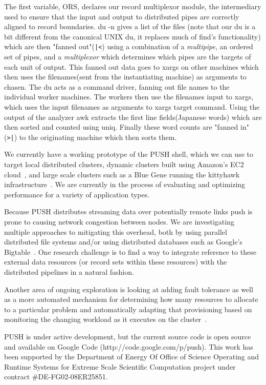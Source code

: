 \documentclass[11pt, letterpaper]{article}
\begin{document}
The first variable, ORS, declares our record multiplexor module, the intermediary 
used to ensure that the input and output to distributed pipes are correctly 
aligned to record boundaries. du -n gives a list of the files (note that our 
du is a bit different from the canonical UNIX du, it replaces much of find's 
functionality) which are then "fanned out"(\verb!|<!) using a combination 
of a \emph{multipipe}, an ordered set of pipes, and a \emph{multiplexor} 
which determines which pipes are the targets of each unit of output.  
This fanned out data goes to xargs on other machines which 
then uses the filenames(sent from the instantiating machine) as arguments to 
chasen. The du acts as a command driver, fanning out file names to the 
individual worker machines. The workers then use the filenames input to 
xargs, which uses the input filenames as arguments to xargs target command. 
Using the output of the analyzer awk extracts the first line fields(Japanese 
words) which are then sorted and counted using uniq.  Finally these word 
counts are "fanned in"(\verb!>|!) to the originating machine which then 
sorts them. 

We currently have a working prototype of the PUSH shell, which we can use
to target local distributed clusters, dynamic clusters built using Amazon's
EC2 cloud~\cite{amazon:aec}, and large scale clusters such as a Blue Gene 
running the kittyhawk infrastructure~\cite{appavoo2008pkb}.  We are currently
in the process of evaluating and optimizing performance for a variety of 
application types.

Because PUSH distributes streaming data over potentially remote links push 
is prone to causing network congestion between nodes. 
We are investigating multiple approaches to mitigating this overhead, both
by using parallel distributed file systems and/or using distributed
databases such as Google's Bigtable~\cite{chang2006bds}.
One research challenge is to find a way to integrate reference to these
external data resources (or record sets within these resources) with the
distributed pipelines in a natural fashion.

Another area of ongoing exploration is looking at adding fault tolerance as 
well as a more automated mechanism for determining how many resources to 
allocate to a particular problem and automatically adapting that provisioning 
based on monitoring the changing workload as it executes on the 
cluster~\cite{evh2008mtags}.

PUSH is under active development, but the current source code is open source 
and available on Google Code (http://code.google.com/p/push).
This work has been supported by the Department of Energy Of Office of Science Operating and Runtime Systems for Extreme Scale Scientific Computation project under contract \#DE-FG02-08ER25851. 

\pagebreak



\end{document}
